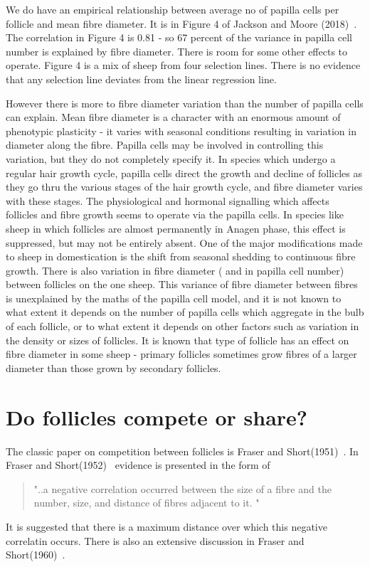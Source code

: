 \documentclass[titlepage]{article}  %
\begin{document}
We do have an empirical relationship between average no of papilla cells per follicle and mean fibre diameter. It is in Figure 4 of Jackson and Moore (2018)~\cite{jack:18}. The correlation in Figure 4 is 0.81 - so 67 percent of the variance in papilla cell number is explained by fibre diameter. There is room for some other effects to operate. Figure 4 is a mix of sheep from four selection lines. There is no evidence that any selection line deviates from the linear regression line.

However there is more to fibre diameter variation than the number of papilla cells can explain. Mean fibre diameter is a character with an enormous amount of phenotypic plasticity - it varies with seasonal conditions resulting in variation in diameter along the fibre. Papilla cells may be involved in controlling this variation, but they do not completely specify it. In species which undergo a regular hair growth cycle, papilla cells direct the growth and decline of follicles as they go thru the various stages of the hair growth cycle, and fibre diameter varies with these stages. The physiological and hormonal signalling which affects follicles  and fibre growth seems to operate via the papilla cells. In species like sheep in which follicles are almost permanently in Anagen phase, this effect is suppressed, but may not be entirely absent. One of the major modifications made to sheep in domestication is the shift from seasonal shedding to continuous fibre growth. There is also variation in fibre diameter ( and in papilla cell number) between follicles on the one sheep. This variance of fibre diameter between fibres is unexplained by the maths of the papilla cell model, and it is not known to what extent it depends on the number of papilla cells which aggregate in the bulb of each follicle, or to what extent it depends on other factors such as variation in the density or sizes of follicles. It is known that type of follicle has an effect on fibre diameter in some sheep - primary follicles sometimes grow fibres of a larger diameter than those grown by secondary follicles.

\section{Do follicles compete or share?}
The classic paper on competition between follicles is Fraser and Short(1951)~\cite{fras:51}.  In Fraser and Short(1952)~\cite{fras:52} evidence is presented in the form of
\begin{quote}
"..a negative correlation occurred between the size of a fibre and the number, size, and distance of fibres adjacent to it.  "
\end{quote}
It is suggested that there is a maximum distance over which this negative correlatin occurs.
There is also an extensive discussion in Fraser and Short(1960)~\cite{fras:60}.
\end{document}
